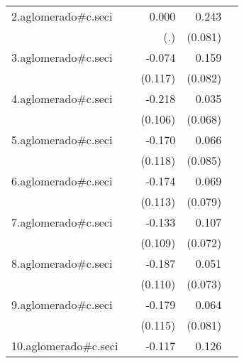 {\begin{longtable}{l*{4}{D{.}{.}{-1}}}
\addlinespace
2.aglomerado#c.seci&                     &       0.000         &       0.243\sym{**} &                     \\
            &                     &         (.)         &     (0.081)         &                     \\
\addlinespace
3.aglomerado#c.seci&                     &      -0.074         &       0.159         &                     \\
            &                     &     (0.117)         &     (0.082)         &                     \\
\addlinespace
4.aglomerado#c.seci&                     &      -0.218\sym{*}  &       0.035         &                     \\
            &                     &     (0.106)         &     (0.068)         &                     \\
\addlinespace
5.aglomerado#c.seci&                     &      -0.170         &       0.066         &                     \\
            &                     &     (0.118)         &     (0.085)         &                     \\
\addlinespace
6.aglomerado#c.seci&                     &      -0.174         &       0.069         &                     \\
            &                     &     (0.113)         &     (0.079)         &                     \\
\addlinespace
7.aglomerado#c.seci&                     &      -0.133         &       0.107         &                     \\
            &                     &     (0.109)         &     (0.072)         &                     \\
\addlinespace
8.aglomerado#c.seci&                     &      -0.187         &       0.051         &                     \\
            &                     &     (0.110)         &     (0.073)         &                     \\
\addlinespace
9.aglomerado#c.seci&                     &      -0.179         &       0.064         &                     \\
            &                     &     (0.115)         &     (0.081)         &                     \\
\addlinespace
10.aglomerado#c.seci&                     &      -0.117         &       0.126\sym{*}  &                     \\

\end{longtable}}
